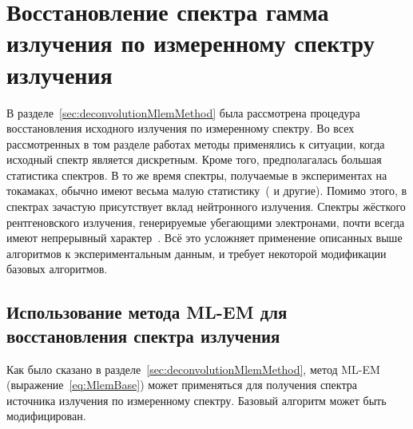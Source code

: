 
\section{ Восстановление спектра гамма излучения по измеренному спектру излучения }

В разделе~\ref{sec:deconvolutionMlemMethod} была рассмотрена процедура восстановления исходного излучения по измеренному спектру. Во всех рассмотренных в том разделе работах методы применялись к ситуации, когда исходный спектр является дискретным. Кроме того, предполагалась большая статистика спектров. В то же время спектры, получаемые в экспериментах на токамаках, обычно имеют весьма малую статистику~(\cite{Khilkevitch2013,Shevelev2018,Reux2022,Chugunov2011,Shevelev2013} и другие). Помимо этого, в спектрах зачастую присутствует вклад нейтронного излучения. Спектры жёсткого рентгеновского излучения, генерируемые убегающими электронами, почти всегда имеют непрерывный характер~\cite{Shevelev2013}. Всё это усложняет применение описанных выше алгоритмов к экспериментальным данным, и требует некоторой модификации базовых алгоритмов.~\cite{Khilkevitch2013}


\subsection{ Использование метода ML-EM для восстановления спектра излучения }

Как было сказано в разделе~\ref{sec:deconvolutionMlemMethod}, метод ML-EM (выражение~\ref{eq:MlemBase}) может применяться для получения спектра источника излучения по измеренному спектру. Базовый алгоритм может быть модифицирован.


